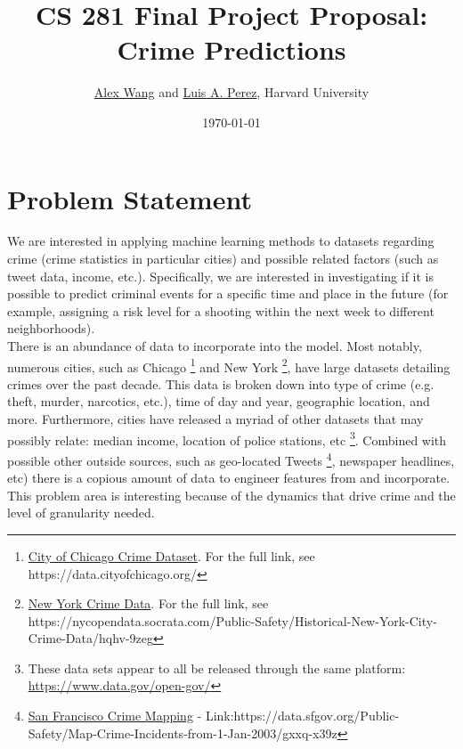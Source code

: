 \documentclass[10pt]{article}
\title{CS 281 Final Project Proposal: Crime Predictions}
\author{\href{mailto:alexwang@college.harvard.edu}{Alex Wang} and \href{mailto:luisperez@college.harvard.edu}{Luis A. Perez}, Harvard University}
\date{\today}
\begin{document}
 \begin{center}
  \end{center}

\section{Problem Statement}

    We are interested in applying machine learning methods to datasets regarding crime (crime statistics in particular cities) and possible related factors (such as tweet data, income, etc.). Specifically, we are interested in investigating if it is possible to predict criminal events for a specific time and place in the future (for example, assigning a risk level for a shooting within the next week to different neighborhoods). \\

  There is an abundance of data to incorporate into the model. Most notably, numerous cities, such as Chicago \footnote{\href{https://data.cityofchicago.org/}{City of Chicago Crime Dataset}. For the full link, see https://data.cityofchicago.org/} and New York \footnote{\href{https://nycopendata.socrata.com/Public-Safety/Historical-New-York-City-Crime-Data/hqhv-9zeg}{New York Crime Data}. For the full link, see https://nycopendata.socrata.com/Public-Safety/Historical-New-York-City-Crime-Data/hqhv-9zeg}, have large datasets detailing crimes over the past decade. This data is broken down into type of crime (e.g. theft, murder, narcotics, etc.), time of day and year, geographic location, and more. Furthermore, cities have released a myriad of other datasets that may possibly relate: median income, location of police stations, etc \footnote{These data sets appear to all be released through the same platform: \href{OpenData}{https://www.data.gov/open-gov/}}. Combined with possible other outside  sources, such as geo-located Tweets \footnote{\href{https://data.sfgov.org/Public-Safety/Map-Crime-Incidents-from-1-Jan-2003/gxxq-x39z}{San Francisco Crime Mapping} - Link:https://data.sfgov.org/Public-Safety/Map-Crime-Incidents-from-1-Jan-2003/gxxq-x39z}, newspaper headlines, etc) there is a copious amount of data to engineer features from and incorporate. This problem area is interesting because of the dynamics that drive crime and the level of granularity needed. \\
\end{document}
